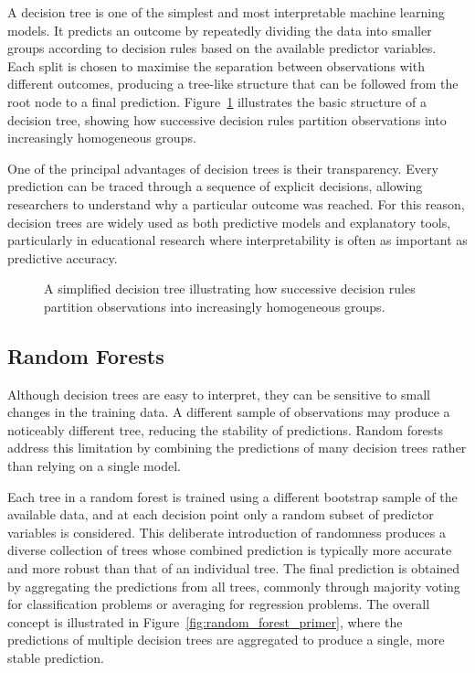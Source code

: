 A decision tree is one of the simplest and most interpretable machine learning models. It predicts an outcome by repeatedly dividing the data into smaller groups 
according to decision rules based on the available predictor variables. Each split is chosen to maximise the separation between observations with different outcomes, 
producing a tree-like structure that can be followed from the root node to a final prediction. Figure~\ref{fig:decision_tree_primer} illustrates the basic structure of a 
decision tree, showing how successive decision rules partition observations into increasingly homogeneous groups.

One of the principal advantages of decision trees is their transparency. Every prediction can be traced through a sequence of explicit decisions, allowing researchers to 
understand why a particular outcome was reached. For this reason, decision trees are widely used as both predictive models and explanatory tools, particularly in educational 
research where interpretability is often as important as predictive accuracy.

\begin{figure}[ht]
\centering
\caption{A simplified decision tree illustrating how successive decision rules partition observations into increasingly homogeneous groups.}
\label{fig:decision_tree_primer}
\end{figure}

\subsection{Random Forests}

Although decision trees are easy to interpret, they can be sensitive to small changes in the training data. A different sample of observations may produce a noticeably 
different tree, reducing the stability of predictions. Random forests address this limitation by combining the predictions of many decision trees rather than relying on a 
single model.

Each tree in a random forest is trained using a different bootstrap sample of the available data, and at each decision point only a random subset of predictor variables is 
considered. This deliberate introduction of randomness produces a diverse collection of trees whose combined prediction is typically more accurate and more robust than that 
of an individual tree. The final prediction is obtained by aggregating the predictions from all trees, commonly through majority voting for classification problems or 
averaging for regression problems. The overall concept is illustrated in Figure~\ref{fig:random_forest_primer}, where the predictions of multiple decision trees are 
aggregated to produce a single, more stable prediction.

